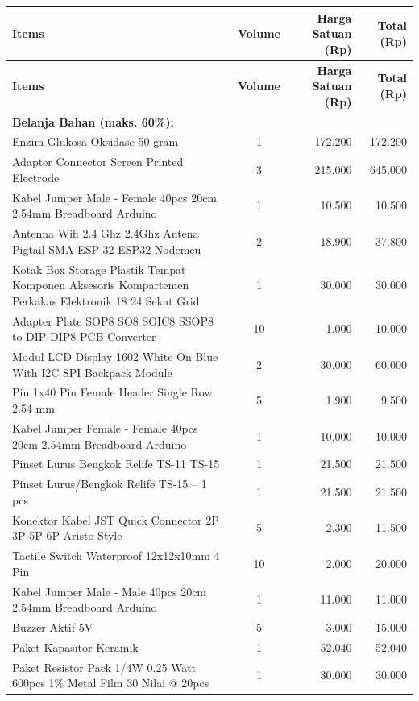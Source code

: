 \documentclass[12pt,a4paper]{article}
\begin{document}
\begin{longtable}{|p{8cm}|c|r|r|}
\hline
\textbf{Items} & \textbf{Volume} & \textbf{Harga Satuan (Rp)} & \textbf{Total (Rp)} \\ \hline
\endfirsthead
\hline
\textbf{Items} & \textbf{Volume} & \textbf{Harga Satuan (Rp)} & \textbf{Total (Rp)} \\ \hline
\endhead
\hline
\multicolumn{4}{|l|}{\textbf{Belanja Bahan (maks. 60\%):}} \\ \hline
Enzim Glukosa Oksidase 50 gram & 1 & 172.200 & 172.200 \\ \hline
Adapter Connector Screen Printed Electrode & 3 & 215.000 & 645.000 \\ \hline
Kabel Jumper Male - Female 40pcs 20cm 2.54mm Breadboard Arduino & 1 & 10.500 & 10.500 \\ \hline
Antenna Wifi 2.4 Ghz 2.4Ghz Antena Pigtail SMA ESP 32 ESP32 Nodemcu & 2 & 18.900 & 37.800 \\ \hline
Kotak Box Storage Plastik Tempat Komponen Aksesoris Kompartemen Perkakas Elektronik 18 24 Sekat Grid & 1 & 30.000 & 30.000 \\ \hline
Adapter Plate SOP8 SO8 SOIC8 SSOP8 to DIP DIP8 PCB Converter & 10 & 1.000 & 10.000 \\ \hline
Modul LCD Display 1602 White On Blue With I2C SPI Backpack Module & 2 & 30.000 & 60.000 \\ \hline
Pin 1x40 Pin Female Header Single Row 2.54 mm & 5 & 1.900 & 9.500 \\ \hline
Kabel Jumper Female - Female 40pcs 20cm 2.54mm Breadboard Arduino & 1 & 10.000 & 10.000 \\ \hline
Pinset Lurus Bengkok Relife TS-11 TS-15 & 1 & 21.500 & 21.500 \\ \hline
Pinset Lurus/Bengkok Relife TS-15 -- 1 pcs & 1 & 21.500 & 21.500 \\ \hline
Konektor Kabel JST Quick Connector 2P 3P 5P 6P Aristo Style & 5 & 2.300 & 11.500 \\ \hline
Tactile Switch Waterproof 12x12x10mm 4 Pin & 10 & 2.000 & 20.000 \\ \hline
Kabel Jumper Male - Male 40pcs 20cm 2.54mm Breadboard Arduino & 1 & 11.000 & 11.000 \\ \hline
Buzzer Aktif 5V & 5 & 3.000 & 15.000 \\ \hline
Paket Kapasitor Keramik & 1 & 52.040 & 52.040 \\ \hline
Paket Resistor Pack 1/4W 0.25 Watt 600pcs 1\% Metal Film 30 Nilai @ 20pcs & 1 & 30.000 & 30.000 \\ \hline

\end{longtable}
\end{document}
